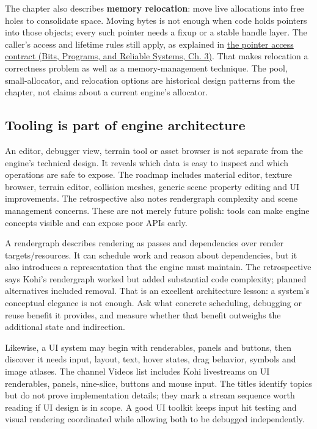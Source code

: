The chapter also describes \textbf{memory relocation}: move live allocations into free holes to consolidate space. Moving bytes is not enough when code holds pointers into those objects; every such pointer needs a fixup or a stable handle layer. The caller's access and lifetime rules still apply, as explained in \href{../01-Bits-Programs-and-Reliable-Systems/main.pdf\#nameddest=01-foundations-i-ch003-a-pointer-carries-an-access-contract}{the pointer access contract (Bits, Programs, and Reliable Systems, Ch. 3)}. That makes relocation a correctness problem as well as a memory-management technique. The pool, small-allocator, and relocation options are historical design patterns from the chapter, not claims about a current engine's allocator.

\subsection{Tooling is part of engine architecture}\label{06-engine-ii-ch032-tooling-is-part-of-engine-architecture}

\hypertarget{06-engine-ii-ch032-tooling-is-part-of-engine-architecture}{}

An editor, debugger view, terrain tool or asset browser is not separate from the engine's technical design. It reveals which data is easy to inspect and which operations are safe to expose. The roadmap includes material editor, texture browser, terrain editor, collision meshes, generic scene property editing and UI improvements. The retrospective also notes rendergraph complexity and scene management concerns. These are not merely future polish: tools can make engine concepts visible and can expose poor APIs early.

A rendergraph describes rendering as passes and dependencies over render targets/resources. It can schedule work and reason about dependencies, but it also introduces a representation that the engine must maintain. The retrospective says Kohi's rendergraph worked but added substantial code complexity; planned alternatives included removal. That is an excellent architecture lesson: a system's conceptual elegance is not enough. Ask what concrete scheduling, debugging or reuse benefit it provides, and measure whether that benefit outweighs the additional state and indirection.

Likewise, a UI system may begin with renderables, panels and buttons, then discover it needs input, layout, text, hover states, drag behavior, symbols and image atlases. The channel Videos list includes Kohi livestreams on UI renderables, panels, nine-slice, buttons and mouse input. The titles identify topics but do not prove implementation details; they mark a stream sequence worth reading if UI design is in scope. A good UI toolkit keeps input hit testing and visual rendering coordinated while allowing both to be debugged independently.

